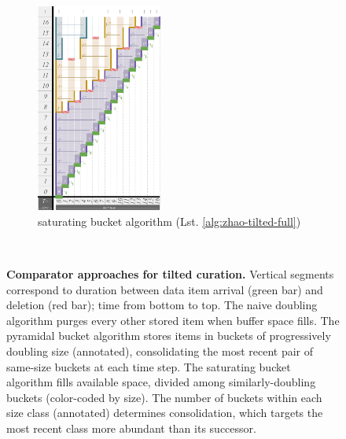 \begin{figure}
\begin{subfigure}{0.52\linewidth}
\centering
\includegraphics[height=2.7in,width=\linewidth,clip]{img/surface-control-tall-zhao-full-desat50}
\centering
\caption{\footnotesize saturating bucket algorithm (Lst. \ref{alg:zhao-tilted-full})}
\label{fig:surface-control-tilted:saturating-bucket}
\end{subfigure}%
\begin{minipage}{0.06\linewidth}
\centering ~
\end{minipage}%
\begin{minipage}[b]{0.42\linewidth}
\caption{%
\textbf{Comparator approaches for tilted curation.}
\footnotesize
Vertical segments correspond to duration between data item arrival (green bar) and deletion (red bar); time from bottom to top.
The naive doubling algorithm purges every other stored item when buffer space fills.
The pyramidal bucket algorithm stores items in buckets of progressively doubling size (annotated), consolidating the most recent pair of same-size buckets at each time step.
The saturating bucket algorithm fills available space, divided among similarly-doubling buckets (color-coded by size).
The number of buckets within each size class (annotated) determines consolidation, which targets the most recent class more abundant than its successor.
}
\label{fig:surface-control-tilted}

\vspace{6ex}

\end{minipage}


\end{figure}
